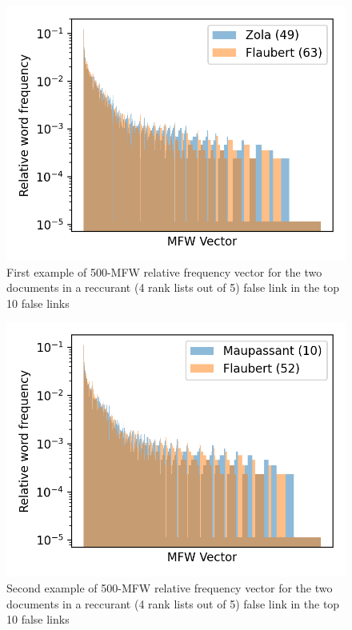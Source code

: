 \begin{figure}
  \includegraphics[width=\linewidth]{img/mfw_vector_error_0.png}
  \caption{First example of 500-MFW relative frequency vector for the two documents in a reccurant (4 rank lists out of 5) false link in the top 10 false links}
  \label{fig:mfw_vector_error_0}
\end{figure}
\begin{figure}
  \includegraphics[width=\linewidth]{img/mfw_vector_error_1.png}
  \caption{Second example of 500-MFW relative frequency vector for the two documents in a reccurant (4 rank lists out of 5) false link in the top 10 false links}
  \label{fig:mfw_vector_error_1}
\end{figure}

